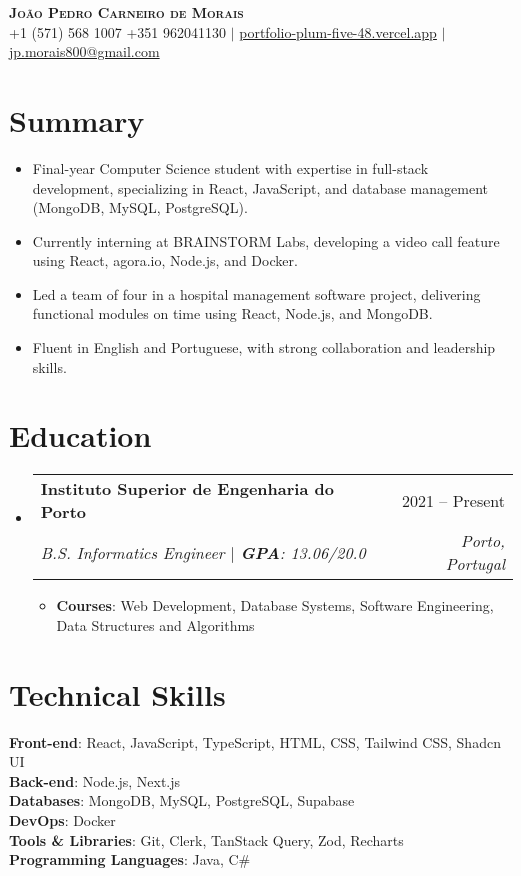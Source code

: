 \documentclass[letterpaper,11pt]{article}
\makeatletter
\newcommand{\resumeItem}[1]{\item\small{#1 \vspace{-2pt}}}
\newcommand{\resumeSubheading}[4]{
  \vspace{-2pt}\item
    \begin{tabular*}{0.97\textwidth}[t]{l@{\extracolsep{\fill}}r}
      \textbf{#1} & #2 \\
      \textit{\small#3} & \textit{\small #4} \\
    \end{tabular*}\vspace{-7pt}
}
\newcommand{\resumeSubHeadingListStart}{\begin{itemize}[leftmargin=0.15in, label={}]}
\newcommand{\resumeSubHeadingListEnd}{\end{itemize}}
\newcommand{\resumeItemListStart}{\begin{itemize}}
\newcommand{\resumeItemListEnd}{\end{itemize}\vspace{-5pt}}
\makeatother
\begin{document}
\begin{center}
    \textbf{\Huge \scshape João Pedro Carneiro de Morais} \\ \vspace{1pt}
    \small +1 (571) 568 1007  +351 962041130 $|$ \href{https://portfolio-plum-five-48.vercel.app/}{portfolio-plum-five-48.vercel.app} $|$ \href{mailto:jp.morais800@gmail.com}{jp.morais800@gmail.com}
\end{center}

\section{Summary}
  \resumeItemListStart
    \resumeItem{Final-year Computer Science student with expertise in full-stack development, specializing in React, JavaScript, and database management (MongoDB, MySQL, PostgreSQL).}
    \resumeItem{Currently interning at BRAINSTORM Labs, developing a video call feature using React, agora.io, Node.js, and Docker.}
    \resumeItem{Led a team of four in a hospital management software project, delivering functional modules on time using React, Node.js, and MongoDB.}
    \resumeItem{Fluent in English and Portuguese, with strong collaboration and leadership skills.}
  \resumeItemListEnd

\section{Education}
  \resumeSubHeadingListStart
    \resumeSubheading
      {Instituto Superior de Engenharia do Porto}{2021 -- Present}
      {B.S. Informatics Engineer $|$ \textbf{GPA}: 13.06/20.0}
      {Porto, Portugal}
      \resumeItemListStart
        \resumeItem{\textbf{Courses}: Web Development, Database Systems, Software Engineering, Data Structures and Algorithms}
      \resumeItemListEnd
  \resumeSubHeadingListEnd

\section{Technical Skills}
 \begin{itemize}[leftmargin=0.15in, label={}]
    \small{\item{
    {\textbf{Front-end}: React, JavaScript, TypeScript, HTML, CSS, Tailwind CSS, Shadcn UI}\\
    {\textbf{Back-end}: Node.js, Next.js}\\
    {\textbf{Databases}: MongoDB, MySQL, PostgreSQL, Supabase}\\
    {\textbf{DevOps}: Docker}\\
    {\textbf{Tools \& Libraries}: Git, Clerk, TanStack Query, Zod, Recharts}\\
    {\textbf{Programming Languages}: Java, C\#}}}
\end{itemize}
\end{document}
